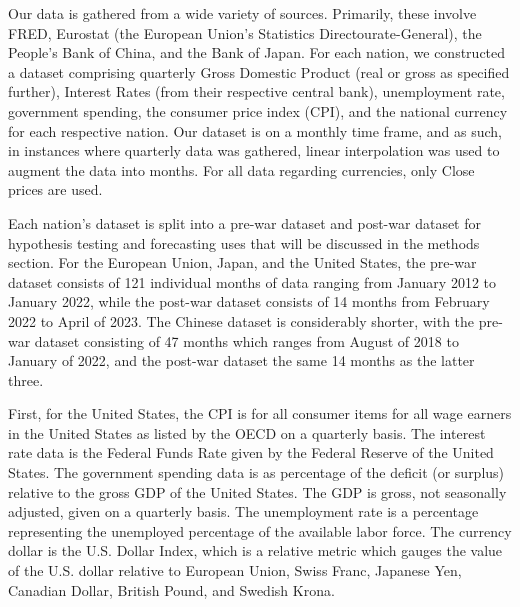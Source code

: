 \documentclass[11pt,regno]{amsart}
\theoremstyle{plain}
\numberwithin{equation}{section}
\begin{document}
Our data is gathered from a wide variety of sources. Primarily, these involve FRED, Eurostat (the European Union's Statistics Directourate-General), the People's Bank of China, and the Bank of Japan. For each nation, we constructed a dataset comprising quarterly Gross Domestic Product (real or gross as specified further), Interest Rates (from their respective central bank), unemployment rate, government spending, the consumer price index (CPI), and the national currency for each respective nation. Our dataset is on a monthly time frame, and as such, in instances where quarterly data was gathered, linear interpolation was used to augment the data into months. For all data regarding currencies, only Close prices are used. 

Each nation's dataset is split into a pre-war dataset and post-war dataset for hypothesis testing and forecasting uses that will be discussed in the methods section. For the European Union, Japan, and the United States, the pre-war dataset consists of 121 individual months of data ranging from January 2012 to January 2022, while the post-war dataset consists of 14 months from February 2022 to April of 2023. The Chinese dataset is considerably shorter, with the pre-war dataset consisting of 47 months which ranges from August of 2018 to January of 2022, and the post-war dataset the same 14 months as the latter three. 



First, for the United States, the CPI is for all consumer items for all wage earners in the United States as listed by the OECD on a quarterly basis. The interest rate data is the Federal Funds Rate given by the Federal Reserve of the United States. The government spending data is as percentage of the deficit (or surplus) relative to the gross GDP of the United States. The GDP is gross, not seasonally adjusted, given on a quarterly basis. The unemployment rate is a percentage representing the unemployed percentage of the available labor force. The currency dollar is the U.S. Dollar Index, which is a relative metric which gauges the value of the U.S. dollar relative to European Union, Swiss Franc, Japanese Yen, Canadian Dollar, British Pound, and Swedish Krona.


\end{document}
